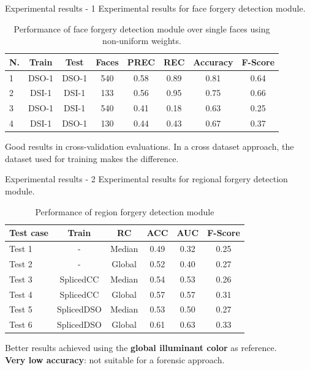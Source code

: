 \begin{tframe}{Experimental results - 1}
Experimental results for face forgery detection module.
\begin{footnotesize}
\begin{table}[h!]
\centering
\begin{tabular}{l c c c c c c c} 
\hline \hline 
\textbf{N.} & \textbf{Train} & \textbf{Test} & \textbf{Faces} & \textbf{PREC} & \textbf{REC} & \textbf{Accuracy} & \textbf{F-Score} \\ [0.5ex]
\hline
1 & DSO-1 & DSO-1 &	540 & 0.58 & 0.89 & 0.81	& 0.64\\
2 & DSI-1 & DSI-1 &	133 & 0.56 & 0.95 & 0.75 & 0.66\\
3 &	DSO-1 & DSI-1 & 540 & 0.41 & 0.18 & 0.63 & 0.25\\ 
4 &	DSI-1 &	DSO-1 &	130 & 0.44 & 0.43 & 0.67 & 0.37\\[1ex]

\hline
\end{tabular}
\caption{Performance of face forgery detection module over single faces using non-uniform weights.}
\label{table:forgerydetections}
\end{table}
\end{footnotesize}
\vspace{0.2cm}
Good results in cross-validation evaluations. In a cross dataset approach, the dataset used for training makes the difference.
\end{tframe}


\begin{tframe}{Experimental results - 2}
Experimental results for regional forgery detection module. 
\begin{footnotesize}
\begin{table}[h!]
\centering
\begin{tabular}{l c c c c c} 
\hline \hline 
\textbf{Test case} & \textbf{Train} & \textbf{RC} & \textbf{ACC} & \textbf{AUC} &\textbf{ F-Score} \\ [0.5ex]
\hline
Test 1 & - & Median & 0.49 & 0.32 & 0.25\\
Test 2 & - & Global & 0.52 & 0.40 & 0.27\\
Test 3 & SplicedCC & Median & 0.54 & 0.53 & 0.26\\
Test 4 & SplicedCC & Global & 0.57 & 0.57 & 0.31\\
Test 5 &	 SplicedDSO & Median & 0.53 & 0.50 & 0.27\\
Test 6 &	 SplicedDSO & Global & 0.61 & 0.63 & 0.33\\ [1ex]
\hline
\end{tabular}
\caption{Performance of region forgery detection module}
\label{table:performanceregionaldet}
\end{table}
\end{footnotesize}
Better results achieved using the\textbf{ global illuminant color }as reference.\\

\vspace{0.2cm}
\textbf{Very low accuracy}: not suitable for a forensic approach.
\end{tframe}

